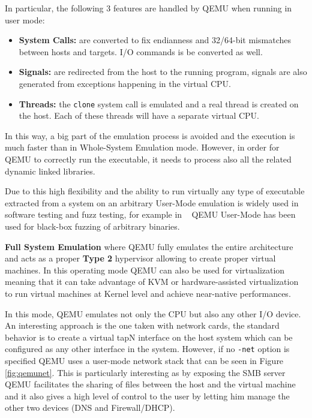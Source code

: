 In particular, the following 3 features are handled by QEMU when running in user mode:

\begin{itemize}
    \item \textbf{System Calls:} are converted to fix endianness and 32/64-bit mismatches between hosts and targets. I/O commands is be converted as well.
    \item \textbf{Signals:} are redirected from the host to the running program, signals are also generated from exceptions happening in the virtual CPU.
    \item \textbf{Threads:} the \lstinline{clone} system call is emulated and a real thread is created on the host. Each of these threads will have a separate virtual CPU.
\end{itemize}

In this way, a big part of the emulation process is avoided and the execution is much faster than in Whole-System Emulation mode. However, in order for QEMU to correctly run the executable, it needs to process also all the related dynamic linked libraries. 

Due to this high flexibility and the ability to run virtually any type of executable extracted from a system on an arbitrary User-Mode emulation is widely used in software testing and fuzz testing, for example in ~\cite{QASan-SecDev20} QEMU User-Mode has been used for black-box fuzzing of arbitrary binaries.

\textbf{Full System Emulation} where QEMU fully emulates the entire architecture and acts as a proper \textbf{Type 2} hypervisor allowing to create proper virtual machines. In this operating mode QEMU can also be used for virtualization meaning that it can take advantage of KVM or hardware-assisted virtualization to run virtual machines at Kernel level and achieve near-native performances. 

In this mode, QEMU emulates not only the CPU but also any other I/O device. An interesting approach is the one taken with network cards, the standard behavior is to create a virtual tapN interface on the host system which can be configured as any other interface in the system. However, if no \lstinline{-net} option is specified QEMU uses a user-mode network stack that can be seen in Figure \ref{fig:qemunet}. This is particularly interesting as by exposing the SMB server QEMU facilitates the sharing of files between the host and the virtual machine and it also gives a high level of control to the user by letting him manage the other two devices (DNS and Firewall/DHCP).


